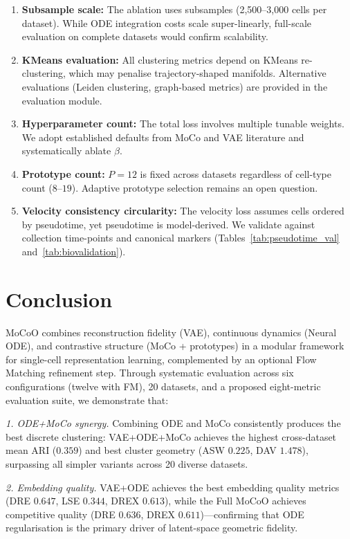 \documentclass[preprint,12pt,number]{elsarticle}
\begin{document}
\begin{enumerate}
    \item \textbf{Subsample scale:} The ablation uses subsamples (2{,}500--3{,}000 cells per dataset). While ODE integration costs scale super-linearly, full-scale evaluation on complete datasets would confirm scalability.
    \item \textbf{KMeans evaluation:} All clustering metrics depend on KMeans re-clustering, which may penalise trajectory-shaped manifolds. Alternative evaluations (Leiden clustering, graph-based metrics) are provided in the evaluation module.
    \item \textbf{Hyperparameter count:} The total loss involves multiple tunable weights. We adopt established defaults from MoCo and VAE literature and systematically ablate $\beta$.
    \item \textbf{Prototype count:} $P{=}12$ is fixed across datasets regardless of cell-type count ($8$--$19$). Adaptive prototype selection remains an open question.
    \item \textbf{Velocity consistency circularity:} The velocity loss assumes cells ordered by pseudotime, yet pseudotime is model-derived. We validate against collection time-points and canonical markers (Tables~\ref{tab:pseudotime_val} and~\ref{tab:biovalidation}).
\end{enumerate}

\section{Conclusion}
\label{sec:conclusion}

MoCoO combines reconstruction fidelity (VAE), continuous dynamics (Neural ODE), and contrastive structure (MoCo + prototypes) in a modular framework for single-cell representation learning, complemented by an optional Flow Matching refinement step. Through systematic evaluation across six configurations (twelve with FM), 20 datasets, and a proposed eight-metric evaluation suite, we demonstrate that:

\textit{1. ODE+MoCo synergy.} Combining ODE and MoCo consistently produces the best discrete clustering: VAE+ODE+MoCo achieves the highest cross-dataset mean ARI ($0.359$) and best cluster geometry (ASW $0.225$, DAV $1.478$), surpassing all simpler variants across 20 diverse datasets.

\textit{2. Embedding quality.} VAE+ODE achieves the best embedding quality metrics (DRE $0.647$, LSE $0.344$, DREX $0.613$), while the Full MoCoO achieves competitive quality (DRE $0.636$, DREX $0.611$)---confirming that ODE regularisation is the primary driver of latent-space geometric fidelity.
\end{document}

